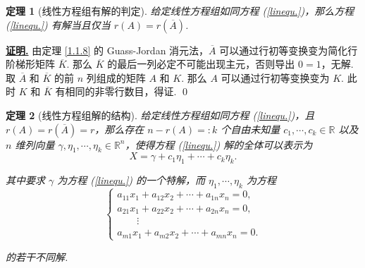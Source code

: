 \documentclass[10pt,openany]{article}
\theoremstyle{thmstyle} %
\newtheorem{theorem}{定理}[subsection]
\theoremstyle{defstyle} %
\theoremstyle{prostyle} %
\theoremstyle{exastyle}
\theoremstyle{remstyle}
\renewenvironment{proof}[1][证明]{\par\underline{\textbf{#1.}} \;\fangsong}{\qed\par}
\begin{document}
\begin{theorem}[线性方程组有解的判定]	\label{1.1.12}
	给定线性方程组如同方程 (\ref{linequ.})，那么方程 (\ref{linequ.}) 有解当且仅当 \( r(A)=r(\overline{A}) \).

\end{theorem}

\begin{proof}
	由定理 \ref{1.1.8} 的 Guass-Jordan 消元法，\( \overline{A} \) 可以通过行初等变换变为简化行阶梯形矩阵 \( \overline{K} \). 那么 \( \overline{K} \) 的最后一列必定不可能出现主元，否则导出 \( 0=1 \)，无解. 取 \( \overline{A} \) 和 \( \overline{K} \) 的前 \( n \) 列组成的矩阵 \( A \) 和 \( K \). 那么 \( A \) 可以通过行初等变换变为 \( K \). 此时 \( K \) 和 \( \overline{K} \) 有相同的非零行数目，得证.
\end{proof}

\begin{theorem}[线性方程组解的结构]	\label{1.1.13}
	给定线性方程组如同方程 (\ref{linequ.})，且 \( r(A)=r(\overline{A})=r \)，那么存在 \( n-r(A)=:k \) 个自由未知量 \( c_1,\cdots,c_{k} \in \mathbb{R} \) 以及 \( n \) 维列向量 \( \gamma,\eta_1,\cdots,\eta_k \in \mathbb{R}^n \)，使得方程 (\ref{linequ.}) 解的全体可以表示为
	\[ X=\gamma+c_1\eta_1+\cdots+c_k\eta_k. \] 
    
    其中要求 \( \gamma \) 为方程 (\ref{linequ.}) 的一个特解，而 \( \eta_1,\cdots,\eta_k \) 为方程
    	\begin{equation}
    		\left\{\begin{array}{l}
    			a_{11}x_1+a_{12}x_2+\cdots+a_{1n}x_n=0, \\
    			a_{21}x_1+a_{22}x_2+\cdots+a_{2n}x_n=0, \\
    			\qquad \vdots \\
    			a_{m1}x_1+a_{m2}x_2+\cdots+a_{mn}x_n=0.
    		\end{array}\right.
    		\label{linequ.2}
    	\end{equation}
    	
    的若干不同解.
\end{theorem}
\end{document}
